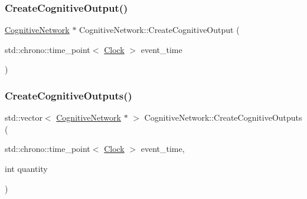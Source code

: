 \mbox{\label{classCognitiveNetwork_ac220350499bd323bd8f24ff0050cd60d}} 
\subsubsection{\texorpdfstring{Create\+Cognitive\+Output()}{CreateCognitiveOutput()}}
{\footnotesize\ttfamily \mbox{\hyperlink{classCognitiveNetwork}{Cognitive\+Network}} $\ast$ Cognitive\+Network\+::\+Create\+Cognitive\+Output (\begin{DoxyParamCaption}\item[{std\+::chrono\+::time\+\_\+point$<$ \mbox{\hyperlink{universe_8h_a0ef8d951d1ca5ab3cfaf7ab4c7a6fd80}{Clock}} $>$}]{event\+\_\+time }\end{DoxyParamCaption})}

\mbox{\label{classCognitiveNetwork_a002df11f4389a122fc140c186ab665c9}} 
\subsubsection{\texorpdfstring{Create\+Cognitive\+Outputs()}{CreateCognitiveOutputs()}}
{\footnotesize\ttfamily std\+::vector$<$ \mbox{\hyperlink{classCognitiveNetwork}{Cognitive\+Network}} $\ast$ $>$ Cognitive\+Network\+::\+Create\+Cognitive\+Outputs (\begin{DoxyParamCaption}\item[{std\+::chrono\+::time\+\_\+point$<$ \mbox{\hyperlink{universe_8h_a0ef8d951d1ca5ab3cfaf7ab4c7a6fd80}{Clock}} $>$}]{event\+\_\+time,  }\item[{int}]{quantity }\end{DoxyParamCaption})}

\mbox{\label{classCognitiveNetwork_af0dc86c7905baae6f2b5efb3a65b8819}} 
